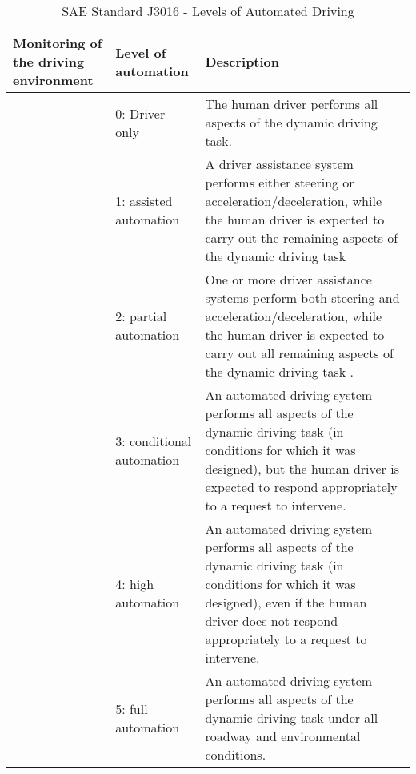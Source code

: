 \documentclass[12pt, usenames, dvipsnames]{report}
\begin{document}
\begin{flushleft}
\vspace{1em}
\begin{table}[h!]
\setlength\extrarowheight{1pt}
\begin{tabular}{@{}>{\raggedright}p{2.5cm}>{\raggedright}p{2.5cm}>{\raggedright\arraybackslash}p{10cm}@{}}
\toprule
Monitoring of the driving environment          & Level of automation       & Description                                                                                                                                                                                                 \\ \midrule
                                           & 0: Driver only            & The human driver performs all aspects of the dynamic driving task.                                                                                                                                           \\ \cmidrule(l){2-3}
                                           & 1: assisted automation    & A driver assistance system performs either steering or acceleration/deceleration, while the human driver is expected to carry out the remaining aspects of the dynamic driving task                         \\ \cmidrule(l){2-3}
\multirow{-5}{*}{Human driver}             & 2: partial automation     & One or more driver assistance systems perform both steering and acceleration/deceleration, while the human driver is expected to carry out all remaining aspects of the dynamic driving task .               \\ \midrule
                                           & 3: conditional automation & An automated driving system performs all aspects of the dynamic driving task (in conditions for which it was designed), but the human driver is expected to respond appropriately to a request to intervene. \\ \cmidrule(l){2-3}
                                           & 4: high automation        & An automated driving system performs all aspects of the dynamic driving task (in conditions for which it was designed), even if the human driver does not respond appropriately to a request to intervene.   \\ \cmidrule(l){2-3}
\multirow{-7}{*}{\parbox{2.5cm}{Automated driving system}} & 5: full automation        & An automated driving system performs all aspects of the dynamic driving task under all roadway and environmental conditions.                                                                                 \\ \cmidrule(l){1-3} 
\end{tabular}
\caption{SAE Standard J3016 - Levels of Automated Driving \cite{sae2018}}
\label{tab:sae-standard}
\end{table}


\end{flushleft}
\end{document}
